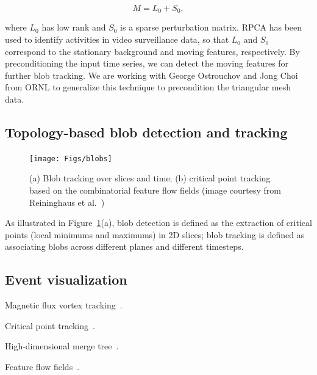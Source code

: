 \begin{equation}
M = L_0 + S_0, 
\end{equation}

\noindent where $L_0$ has low rank and $S_0$ is a sparse perturbation matrix.  RPCA has been used to identify activities in video surveillance data, so that $L_0$ and $S_0$ correspond to the stationary background and moving features, respectively.  By preconditioning the input time series, we can detect the moving features for further blob tracking.  We are working with George Ostrouchov and Jong Choi from ORNL to generalize this technique to precondition the triangular mesh data.  


\subsection{Topology-based blob detection and tracking}

\begin{figure}[!h]
  \centering
  \texttt{[image: Figs/blobs]}
  \caption{(a) Blob tracking over slices and time; (b) critical point tracking based on the combinatorial feature flow fields (image courtesy from Reininghaus et al.~\cite{ReininghausKWH12})}
  \label{fig:blob}
\end{figure}


As illustrated in Figure~\ref{fig:blob}(a), blob detection is defined as the extraction of critical points (local minimums and maximums) in 2D slices; blob tracking is defined as associating blobs across different planes and different timesteps.  



\subsection{Event visualization}





Magnetic flux vortex tracking~\cite{GuoPPKG16, GuoPG17, PhillipsGPKG16, PhillipsPKG15}.

Critical point tracking~\cite{ReininghausKWH12}.

High-dimensional merge tree~\cite{OesterlingHWMS17}. 

Feature flow fields~\cite{TheiselS03}. 
